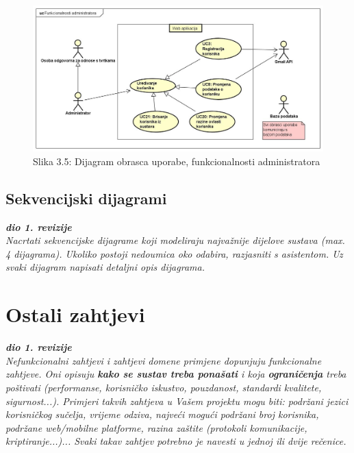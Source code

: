 					\begin{figure}[H]
						\includegraphics[scale=0.4]{slike/UC dijagrami/UseCase administrator}
						\centering
						\caption{Slika 3.5: Dijagram obrasca uporabe, funkcionalnosti administratora}
						\label{fig:administrator}
					\end{figure}

				\eject
				
			\subsection{Sekvencijski dijagrami}
				
				\textbf{\textit{dio 1. revizije}}\\
				
				\textit{Nacrtati sekvencijske dijagrame koji modeliraju najvažnije dijelove sustava (max. 4 dijagrama). Ukoliko postoji nedoumica oko odabira, razjasniti s asistentom. Uz svaki dijagram napisati detaljni opis dijagrama.}
				\eject
	
		\section{Ostali zahtjevi}
		
			\textbf{\textit{dio 1. revizije}}\\

			 \textit{Nefunkcionalni zahtjevi i zahtjevi domene primjene dopunjuju funkcionalne zahtjeve. Oni opisuju \textbf{kako se sustav treba ponašati} i koja \textbf{ograničenja} treba poštivati (performanse, korisničko iskustvo, pouzdanost, standardi kvalitete, sigurnost...). Primjeri takvih zahtjeva u Vašem projektu mogu biti: podržani jezici korisničkog sučelja, vrijeme odziva, najveći mogući podržani broj korisnika, podržane web/mobilne platforme, razina zaštite (protokoli komunikacije, kriptiranje...)... Svaki takav zahtjev potrebno je navesti u jednoj ili dvije rečenice.}\\

